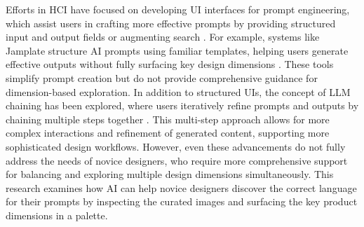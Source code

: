 Efforts in HCI have focused on developing UI interfaces for prompt engineering, which assist users in crafting more effective prompts by providing structured input and output fields \cite{choi2024creativeconnect, suh2024luminate, brade2023promptify} or augmenting search \cite{son2024genquery, chen2024memovis}. For example, systems like Jamplate structure AI prompts using familiar templates, helping users generate effective outputs without fully surfacing key design dimensions \cite{xu2024jamplate}. These tools simplify prompt creation but do not provide comprehensive guidance for dimension-based exploration. In addition to structured UIs, the concept of LLM chaining has been explored, where users iteratively refine prompts and outputs by chaining multiple steps together \cite{liu2022opal, di2022idea, wu2022promptchainer}. This multi-step approach allows for more complex interactions and refinement of generated content, supporting more sophisticated design workflows. However, even these advancements do not fully address the needs of novice designers, who require more comprehensive support for balancing and exploring multiple design dimensions simultaneously. This research examines how AI can help novice designers discover the correct language for their prompts by inspecting the curated images and surfacing the key product dimensions in a palette.
